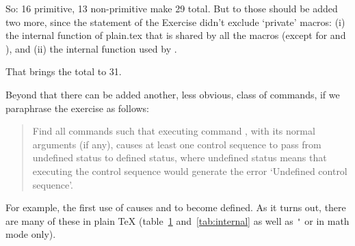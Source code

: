 So: 16 primitive, 13 non-primitive make 29 total. But to those should
be added two more, since the statement of the Exercise didn't exclude
`private' macros: (i) the internal function \cmd{\alloc@} of plain.tex
that is shared by all the \cmd{\newxxx} macros (except for \cmd{\newif} and
\cmd{\newhelp}), and (ii) the internal function \cmd{\@if} used by \cmd{\newif}.

That brings the total to 31.

Beyond that there can be added another, less obvious, class of
commands, if we paraphrase the exercise as follows:
\begin{quote}
  Find all commands such that executing command \cmd{\xxx}, with its normal
  arguments (if any), causes at least one control sequence to pass
  from undefined status to defined status, where undefined status
  means that executing the control sequence would generate the error
  `Undefined control sequence'.
\end{quote}
For example, the first use of \cmd{\loop} causes \cmd{\body} and \cmd{\next} to become
defined. As it turns out, there are many of these in plain TeX 
(table~\ref{tab:user} and~\ref{tab:internal} as well as \verb?'? or \cmd{\rq}
in math mode only).

\begin{comment}
User functions:
\begin{lcode}
\loop, \t, \smash, \vfootnote, \settabs, \phantom,
\vphantom, \hphantom, \footnote, \multispan, \longleftarrow,
\longrightarrow, \mathstrut, \longmapsto, \matrix, \pmatrix;
\end{lcode}
\verb?'? or \cmd{\rq} (math mode only)
\end{comment}

\begin{figure}
\label{tab:user}
\end{figure}


\begin{comment}
Internal functions: 
\begin{lcode}
\iterate, \relbar, \sett@b, \s@tt@b, \prim@s,
\ph@nt, \fo@t, \f@@t, \pr@m@s, \pr@@@s, \s@tcols
\end{lcode}
\end{comment}

